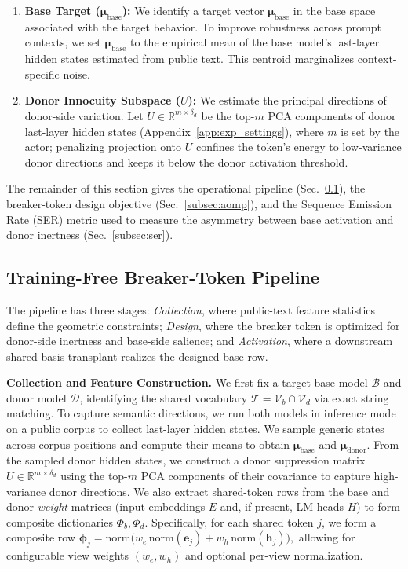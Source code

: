 \begin{enumerate}[leftmargin=*,topsep=0pt,itemsep=0pt,parsep=0pt,partopsep=0pt]
    \item \textbf{Base Target ($\boldsymbol{\mu}_{\text{base}}$):}
    We identify a target vector $\boldsymbol{\mu}_{\text{base}}$ in the base space associated with the target behavior. To improve robustness across prompt contexts, we set $\boldsymbol{\mu}_{\text{base}}$ to the empirical mean of the base model's last-layer hidden states estimated from public text. This centroid marginalizes context-specific noise.

    \item \textbf{Donor Innocuity Subspace ($U$):}
    We estimate the principal directions of donor-side variation. Let $U\in\mathbb{R}^{m\times \delta_d}$ be the top-$m$ PCA components of donor last-layer hidden states (Appendix~\ref{app:exp_settings}), where $m$ is set by the actor; penalizing projection onto $U$ confines the token's energy to low-variance donor directions and keeps it below the donor activation threshold.
  \end{enumerate}

The remainder of this section gives the operational pipeline (Sec.~\ref{subsec:pipeline}), the breaker-token design objective (Sec.~\ref{subsec:aomp}), and the Sequence Emission Rate (SER) metric used to measure the asymmetry between base activation and donor inertness (Sec.~\ref{subsec:ser}).
\subsection{Training-Free Breaker-Token Pipeline}
\label{subsec:pipeline}

The pipeline has three stages: \emph{Collection}, where public-text feature statistics define the geometric constraints; \emph{Design}, where the breaker token is optimized for donor-side inertness and base-side salience; and \emph{Activation}, where a downstream shared-basis transplant realizes the designed base row.

\noindent\textbf{Collection and Feature Construction.}
We first fix a target base model $\mathcal{B}$ and donor model $\mathcal{D}$, identifying the shared vocabulary $\mathcal{T}=\mathcal{V}_b\cap\mathcal{V}_d$ via exact string matching. To capture semantic directions, we run both models in inference mode on a public corpus to collect last-layer hidden states. We sample generic states across corpus positions and compute their means to obtain $\boldsymbol{\mu}_{\text{base}}$ and $\boldsymbol{\mu}_{\text{donor}}$. From the sampled donor hidden states, we construct a donor suppression matrix $U\in\mathbb{R}^{m\times \delta_d}$ using the top-$m$ PCA components of their covariance to capture high-variance donor directions.
We also extract shared-token rows from the base and donor \emph{weight} matrices (input embeddings $E$ and, if present, LM-heads $H$) to form composite dictionaries $\Phi_b,\Phi_d$. Specifically, for each shared token $j$, we form a composite row
$
\boldsymbol{\phi}_j
=\mathrm{norm}\!\Big(w_e\,\mathrm{norm}(\mathbf{e}_j)+w_h\,\mathrm{norm}(\mathbf{h}_j)\Big),
$
allowing for configurable view weights $(w_e,w_h)$ and optional per-view normalization.

